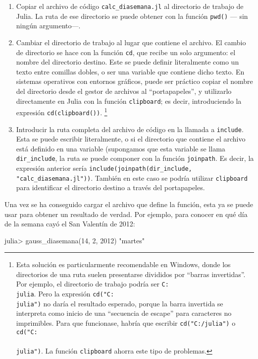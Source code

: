﻿\documentclass{article}
\newcommand{\jl}{\texttt}
\begin{document}
\begin{enumerate}
  \item Copiar el archivo de código \jl{calc_diasemana.jl} al directorio de trabajo de Julia. La ruta de ese directorio se puede obtener con la función \jl{pwd()} --- sin ningún argumento---.
  \item Cambiar el directorio de trabajo al lugar que contiene el archivo. El cambio de directorio se hace con la función \jl{cd}, que recibe un solo argumento: el nombre del directorio destino. Este se puede definir literalmente como un texto entre comillas dobles, o ser una variable que contiene dicho texto. En sistemas operativos con entornos gráficos, puede ser práctico copiar el nombre del directorio desde el gestor de archivos al ``portapapeles'', y utilizarlo directamente en Julia con la función \jl{clipboard}; es decir, introduciendo la expresión \jl{cd(clipboard())}.%
  \footnote{%
  Esta solución es particularmente recomendable en Windows, donde los directorios de una ruta suelen presentarse divididos por ``barras invertidas''. Por ejemplo, el directorio de trabajo podría ser \texttt{C:\\julia}. Pero la expresión \jl{cd("C:\\julia")} no daría el resultado esperado, porque la barra invertida se interpreta como inicio de una ``secuencia de escape'' para caracteres no imprimibles. Para que funcionase, habría que escribir \jl{cd("C:/julia")} o \jl{cd("C:\\\\julia")}. La función \jl{clipboard} ahorra este tipo de problemas.%
  }
  \item Introducir la ruta completa del archivo de código en la llamada a \jl{include}. Esta se puede escribir literalmente, o si el directorio que contiene el archivo está definido en una variable (supongamos que esta variable se llama \jl{dir_include}, la ruta se puede componer con la función \jl{joinpath}. Es decir, la expresión anterior sería \jl{include(joinpath(dir_include, "calc_diasemana.jl"))}. También en este caso se podría utilizar \jl{clipboard} para identificar el directorio destino a través del portapapeles.
\end{enumerate}

Una vez se ha conseguido cargar el archivo que define la función, esta ya se puede usar para obtener un resultado de verdad. Por ejemplo, para conocer en qué día de la semana cayó el San Valentín de 2012:

julia> gauss_diasemana(14, 2, 2012)
"martes"
\end{document}
